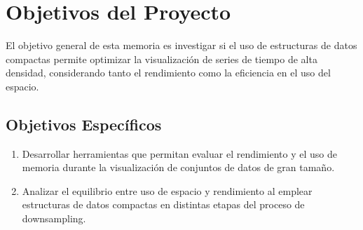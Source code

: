 \section{Objetivos del Proyecto}

El objetivo general de esta memoria es investigar si el uso de estructuras de datos compactas permite optimizar la visualización de series de tiempo de alta densidad, considerando tanto el rendimiento como la eficiencia en el uso del espacio.

\subsection{Objetivos Específicos}
\begin{enumerate}
\item Desarrollar herramientas que permitan evaluar el rendimiento y el uso de memoria durante la visualización de conjuntos de datos de gran tamaño.
\item Analizar el equilibrio entre uso de espacio y rendimiento al emplear estructuras de datos compactas en distintas etapas del proceso de downsampling.
\end{enumerate}

